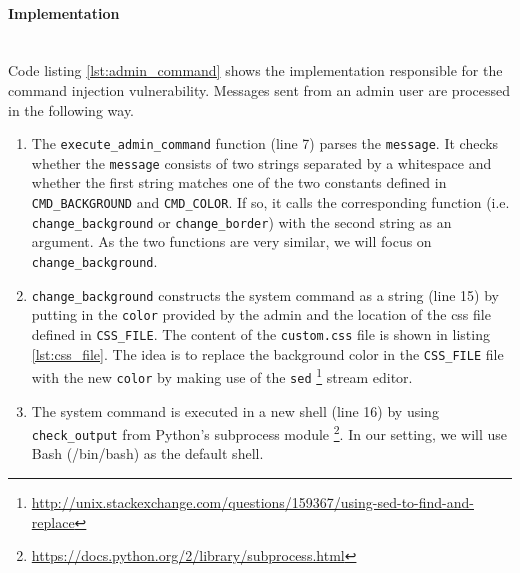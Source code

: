 \documentclass[12pt,a4paper]{article}
\newcommand{\code}[1]{\texttt{#1}}
\begin{document}
\paragraph{Implementation}

\noindent \\Code listing \ref{lst:admin_command} shows the implementation responsible for the command injection vulnerability. Messages sent from an admin user are processed in the following way.

\begin{enumerate}
\item The \code{execute\_admin\_command} function (line 7) parses the \code{message}. It checks whether the \code{message} consists of two strings separated by a whitespace and whether the first string matches one of the two constants defined in \code{CMD\_BACKGROUND} and \code{CMD\_COLOR}. If so, it calls the corresponding function (i.e. \code{change\_background} or \code{change\_border}) with the second string as an argument. As the two functions are very similar, we will focus on \code{change\_background}.

\item \code{change\_background} constructs the system command as a string (line 15) by putting in the \code{color} provided by the admin and the location of the css file defined in \code{CSS\_FILE}. The content of the \code{custom.css} file is shown in listing \ref{lst:css_file}. The idea is to replace the background color in the \code{CSS\_FILE} file with the new \code{color} by making use of the \code{sed} \footnote{\url{http://unix.stackexchange.com/questions/159367/using-sed-to-find-and-replace}} stream editor.

\item  The system command is executed in a new shell (line 16) by using \code{check\_output} from Python's subprocess module \footnote{\url{https://docs.python.org/2/library/subprocess.html}}. In our setting, we will use Bash (/bin/bash) as the default shell.
\end{enumerate}
\end{document}
